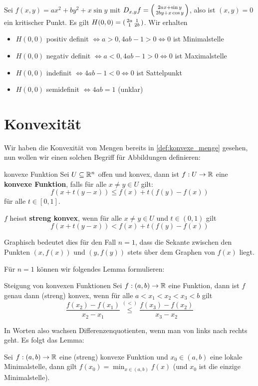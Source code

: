 \begin{example} Sei $f(x,y) = ax^2 + by^2 + x \sin y$ mit $D_{x,y}f = \left(\begin{smallmatrix} 2ax+\sin y\\2by + x \cos y \end{smallmatrix}\right)$, also ist $(x,y) = 0$ ein kritischer Punkt. Es gilt $H(0,0) = \left(\begin{smallmatrix} 2a & 1\\1 & 2b \end{smallmatrix}\right)$. Wir erhalten
\begin{itemize}
    \item $H(0,0)$ positiv definit $\iff a > 0, 4ab - 1 > 0 \iff 0$ ist Minimalstelle
    \item $H(0,0)$ negativ definit $\iff a < 0, 4ab - 1 > 0 \iff 0$ ist Maximalstelle 
    \item $H(0,0)$ indefinit $\iff 4ab-1 < 0 \iff 0$ ist Sattelpunkt
    \item $H(0,0)$ semidefinit $\iff 4ab=1$ (unklar)
\end{itemize}
\end{example}

\section{Konvexität}
Wir haben die Konvexität von Mengen bereits in \ref{def:konvexe_menge} gesehen, nun wollen wir einen solchen Begriff für Abbildungen definieren:
\begin{definition}{konvexe Funktion}{}
Sei $U \subseteq \mathbb{R}^n$ offen und konvex, dann ist $f: U \to \mathbb{R}$ eine \textbf{konvexe Funktion}, falls für alle $x\ne y \in U$ gilt:
$$f(x+t(y-x)) \leq f(x) + t(f(y)- f(x))$$
für alle $t \in [0,1]$.

$f$ heisst \textbf{streng konvex}, wenn für alle $x\ne y \in U$ und $t \in (0,1)$ gilt
$$f(x+t(y-x)) < f(x) + t(f(y)- f(x))$$
\end{definition}
Graphisch bedeutet dies für den Fall $n=1$, dass die Sekante zwischen den Punkten $(x, f(x))$ und $(y,f(y))$ stets über dem Graphen von $f(x)$ liegt.

Für $n=1$ können wir folgendes Lemma formulieren:
\begin{lemma}{Steigung von konvexen Funktionen}{}
Sei $f:(a,b) \to \mathbb{R}$ eine Funktion, dann ist $f$ genau dann (streng) konvex, wenn für alle $a < x_1 < x_2 < x_3 < b$ gilt
$$\frac{f(x_2)-f(x_1)}{x_2-x_1} \stackrel{(<)}{\leq} \frac{f(x_3)-f(x_2)}{x_3-x_2}$$
\end{lemma}
In Worten also wachsen Differenzenquotienten, wenn man von links nach rechts geht. Es folgt das Lemma:
\begin{lemma}{}{}
Sei $f:(a,b) \to \mathbb{R}$ eine (streng) konvexe Funktion und $x_0 \in (a,b)$ eine lokale Minimalstelle, dann gilt $f(x_0) = \min_{x \in (a,b)} f(x)$ (und $x_0$ ist die einzige Minimalstelle).
\end{lemma}

